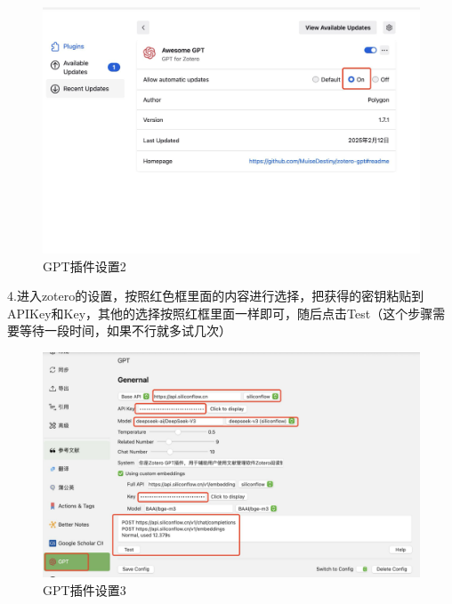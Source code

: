 \documentclass[]{ctexbook}
\theoremstyle{definition}
\theoremstyle{definition}
\theoremstyle{definition}
\theoremstyle{definition}
\theoremstyle{remark}
\begin{document}
\begin{figure}

{\centering \includegraphics[width=1\linewidth]{img/zotero/zotero_plugins_deepseek_4} 

}

\caption{GPT插件设置2}\label{fig:zotero-plugins-deepseek-4}
\end{figure}

4.进入zotero的设置，按照红色框里面的内容进行选择，把获得的密钥粘贴到APIKey和Key，其他的选择按照红框里面一样即可，随后点击Test（这个步骤需要等待一段时间，如果不行就多试几次）

\begin{figure}

{\centering \includegraphics[width=1\linewidth]{img/zotero/zotero_plugins_deepseek_5} 

}

\caption{GPT插件设置3}\label{fig:zotero-plugins-deepseek-5}
\end{figure}
\end{document}

